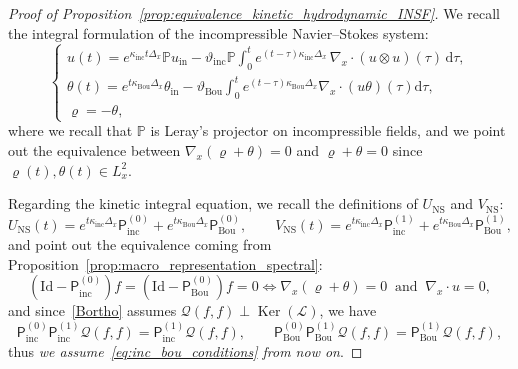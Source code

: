 \documentclass[AHL,Unicode,longabstracts,published]{cedram}
\DeclareMathOperator{\nul}{Ker}
\newcommand{\ini}{\mathrm{in}}
\newcommand{\ns}{\mathrm{NS}}
\newcommand{\Id}{\mathrm{Id}}
\renewcommand{\d}{\mathrm{d}}
\newcommand{\Inc}{\mathrm{inc}}
\newcommand{\Bou}{\mathrm{Bou}}
\newcommand{\bbP}{\mathbb{P}}
\newcommand{\LL}{\mathcal{L}}
\newcommand{\PP}{\mathsf{P}}
\newcommand{\QQ}{\mathcal{Q}}
\begin{document}
\begin{proof}[Proof of Proposition~\ref{prop:equivalence_kinetic_hydrodynamic_INSF}]
We recall the integral formulation of the incompressible Navier--Stokes system:
\[
\begin{cases}
\displaystyle u(t) = e^{ \kappa_\Inc t \Delta_x } \bbP u_\ini - \vartheta_\Inc \bbP \int_0^t e^{(t-\tau) \kappa_\Inc \Delta_x} \, \nabla_x \cdot \left(u \otimes u \right) (\tau) \, \d \tau, \\
\displaystyle \theta(t) = e^{ t \kappa_\Bou \Delta_x} \theta_\ini - \vartheta_\Bou \int_0^t e^{(t-\tau) \kappa_\Bou \Delta_x } \nabla_x \cdot (u \theta)(\tau) \d \tau, \\
\varrho = - \theta,
\end{cases}
\]
where we recall that $\bbP$ is Leray's projector on incompressible fields, and we point out the equivalence between $\nabla_x(\varrho +\theta) = 0$ and $\varrho + \theta = 0$ since $\varrho(t), \theta(t) \in L^2_x$.

Regarding the kinetic integral equation, we recall the definitions of $U_\ns$ and $V_\ns$:
\[
U_\ns(t) = e^{t \kappa_\Inc \Delta_x} \PP^{(0)}_{\Inc} + e^{t \kappa_\Bou \Delta_x} \PP^{(0)}_{\Bou}, \qquad V_\ns(t) = e^{t \kappa_\Inc \Delta_x} \PP^{(1)}_{\Inc} + e^{t \kappa_\Bou \Delta_x} \PP^{(1)}_{\Bou},
\]
and point out the equivalence coming from Proposition~\ref{prop:macro_representation_spectral}:
\begin{equation}\label{eq:inc_bou_conditions}
\left(\Id - \PP^{(0)}_\Inc \right) f = \left(\Id - \PP_\Bou^{(0)} \right) f = 0 \iff \nabla_x (\varrho + \theta) = 0~\text{ and }~\nabla_x \cdot u = 0,
\end{equation}
and since~\eqref{Bortho} assumes $\QQ(f, f) \perp \nul(\LL)$, we have
\[
\PP^{(0)}_\Inc \PP^{(1)}_\Inc \QQ(f, f) = \PP^{(1)}_\Inc \QQ(f, f), \qquad\PP^{(0)}_\Bou \PP^{(1)}_\Bou \QQ(f, f) = \PP^{(1)}_\Bou \QQ(f, f),
\]
thus \emph{we assume~\eqref{eq:inc_bou_conditions} from now on}.


\end{proof}
\end{document}
